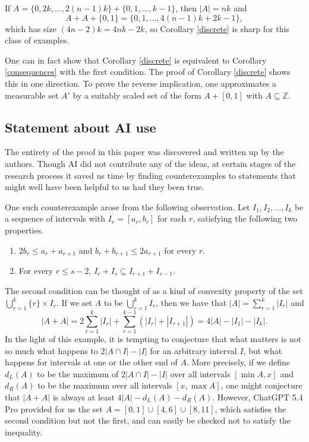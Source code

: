 \documentclass[11pt,reqno]{amsart}
\theoremstyle{definition}
\def\Z{\mathbb{Z}}
\def\subset{\subseteq}
\begin{document}
If $A=\{0,2k,\dots,2(n-1)k\}+\{0,1,\dots,k-1\}$, then $|A|=nk$ and 
\[A+A+\{0,1\}=\{0,1,\dots,4(n-1)k+2k-1\},\] 
which has size $(4n-2)k=4nk-2k$, so Corollary \ref{discrete} is sharp for this class of examples. 

One can in fact show that Corollary \ref{discrete} is equivalent to Corollary \ref{consequences} with the first condition. The proof of Corollary \ref{discrete} shows this in one direction. To prove the reverse implication, one approximates a measurable set $A'$ by a suitably scaled set of the form $A+[0,1]$ with $A\subset\Z$.


\subsection{Statement about AI use}

The entirety of the proof in this paper was discovered and written up by the authors. Though AI did not contribute any of the ideas, at certain stages of the research process it saved us time by finding counterexamples to statements that might well have been helpful to us had they been true. 

One such counterexample arose from the following observation. Let $I_1,I_2,\dots,I_k$ be a sequence of intervals with $I_r=[a_r,b_r]$ for each $r$, satisfying the following two properties.
\begin{enumerate}
    \item $2b_r\leq a_r+a_{r+1}$ and $b_r+b_{r+1}\leq 2a_{r+1}$ for every $r$.
    \item For every $r\leq s-2$, $I_r+I_s\subset I_{r+1}+I_{s-1}$.
\end{enumerate}
The second condition can be thought of as a kind of convexity property of the set $\bigcup_{r=1}^k\{r\}\times I_r$. If we set $A$ to be $\bigcup_{r=1}^kI_r$, then we have that $|A|=\sum_{r=1}^k|I_r|$ and 
\[|A+A|=2\sum_{r=1}^k|I_r|+\sum_{r=1}^{k-1}(|I_r|+|I_{r+1}|)=4|A|-|I_1|-|I_k|.\]
In the light of this example, it is tempting to conjecture that what matters is not so much what happens to $2|A\cap I|-|I|$ for an arbitrary interval $I$, but what happens for intervals at one or the other end of $A$. More precisely, if we define $d_L(A)$ to be the maximum of $2|A\cap I|-|I|$ over all intervals $[\min A,x]$ and $d_R(A)$ to be the maximum over all intervals $[x,\max A]$, one might conjecture that $|A+A|$ is always at least $4|A|-d_L(A)-d_R(A)$. However, ChatGPT 5.4 Pro provided for us the set $A=[0,1]\cup[4,6]\cup[8,11]$, which satisfies the second condition but not the first, and can easily be checked not to satisfy the inequality. 
\end{document}
